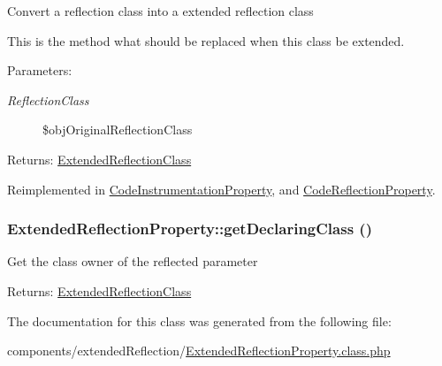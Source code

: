 Convert a reflection class into a extended reflection class

This is the method what should be replaced when this class be extended.

\begin{Desc}
\item[Parameters:]
\begin{description}
\item[{\em ReflectionClass}]\$objOriginalReflectionClass \end{description}
\end{Desc}
\begin{Desc}
\item[Returns:]\hyperlink{class_extended_reflection_class}{ExtendedReflectionClass} \end{Desc}


Reimplemented in \hyperlink{class_code_instrumentation_property_192bcd477b39d69274c9a7db05cc606d}{CodeInstrumentationProperty}, and \hyperlink{class_code_reflection_property_ada66f395b16622378963471801f11ad}{CodeReflectionProperty}.\hypertarget{class_extended_reflection_property_af1e7fdb7af7548692400dcad6c85c65}{
\subsubsection[{getDeclaringClass}]{\setlength{\rightskip}{0pt plus 5cm}ExtendedReflectionProperty::getDeclaringClass ()}}
\label{class_extended_reflection_property_af1e7fdb7af7548692400dcad6c85c65}


Get the class owner of the reflected parameter

\begin{Desc}
\item[Returns:]\hyperlink{class_extended_reflection_class}{ExtendedReflectionClass} \end{Desc}


The documentation for this class was generated from the following file:\begin{CompactItemize}
\item 
components/extendedReflection/\hyperlink{_extended_reflection_property_8class_8php}{ExtendedReflectionProperty.class.php}\end{CompactItemize}
